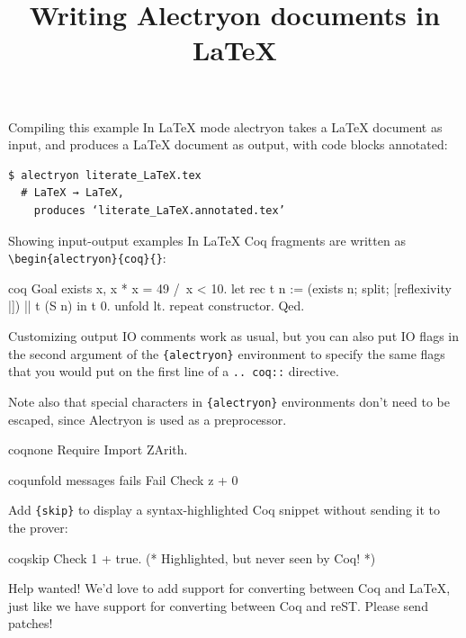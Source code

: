 \documentclass[10pt]{beamer}
\title{Writing Alectryon documents in LaTeX}
\begin{document}
\maketitle

\begin{frame}[fragile]{Compiling this example}
  In LaTeX mode alectryon takes a LaTeX document as input, and produces a LaTeX
  document as output, with code blocks annotated:

  \begin{verbatim}
$ alectryon literate_LaTeX.tex
  # LaTeX → LaTeX,
    produces ‘literate_LaTeX.annotated.tex’
  \end{verbatim}
\end{frame}

\begin{frame}[fragile]{Showing input-output examples}
  In LaTeX Coq fragments are written as \verb|\begin{alectryon}{coq}{}|:

  \begin{alectryon}{coq}{}
  Goal exists x, x * x = 49 /\ x < 10.
    let rec t n :=
      (exists n; split; [reflexivity |]) || t (S n) in
    t 0.
    unfold lt.
    repeat constructor.
  Qed.
  \end{alectryon}
\end{frame}

\begin{frame}[fragile]{Customizing output}
  IO comments work as usual, but you can also put IO flags in the second argument of the \verb|{alectryon}| environment to specify the same flags that you would put on the first line of a \verb|.. coq::| directive.

  Note also that special characters in \verb|{alectryon}| environments don't need to be escaped, since Alectryon is used as a preprocessor.

  \begin{alectryon}{coq}{none}
  Require Import ZArith.
  \end{alectryon}

  \begin{alectryon}{coq}{unfold messages fails}
  Fail Check z + 0%
  \end{alectryon}

  Add \verb|{skip}| to display a syntax-highlighted Coq snippet without sending it to the prover:

  \begin{alectryon}{coq}{skip}
  Check 1 + true. (* Highlighted, but never seen by Coq! *)
  \end{alectryon}
\end{frame}

\begin{frame}{Help wanted!}
  We'd love to add support for converting between Coq and LaTeX, just like we have support for converting between Coq and reST.  Please send patches!
\end{frame}
\end{document}
